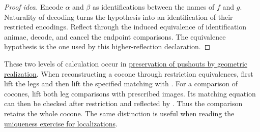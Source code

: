 \documentclass[11pt]{article}
\begin{document}
\begin{proof}[Proof idea]
Encode $\alpha$ and $\beta$ as identifications between the names of
$f$ and $g$. Naturality of decoding turns the hypothesis into an
identification of their restricted encodings. Reflect through the
induced equivalence of identification animae, decode, and cancel the
endpoint comparisons. The equivalence hypothesis is the one used by
this higher-reflection declaration.
\end{proof}

These two levels of calculation occur in
\href{geometric-realizations.html}{preservation of pushouts by geometric
realization}. When reconstructing a cocone through restriction equivalences,
first lift the legs and then lift the specified matching with
. For a comparison of cocones,
lift both leg comparisons with prescribed images. Its matching equation
can then be checked after restriction and reflected by
. Thus the comparison
retains the whole cocone. The same distinction is useful when reading the
\href{chapter-3-exercises.html}{uniqueness exercise for localizations}.
\end{document}
